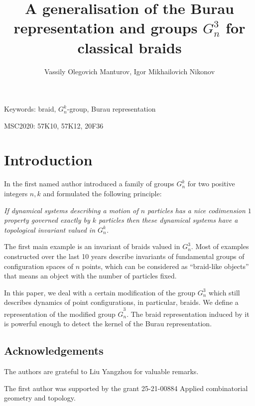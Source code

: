 \documentclass{article}
\title{A generalisation of the Burau representation and groups $G_{n}^{3}$ for classical braids}
\author{Vassily Olegovich Manturov, Igor Mikhailovich Nikonov}
\date{}
\theoremstyle{definition}
\begin{document}
\maketitle


{Keywords: braid, $G^k_n$-group, Burau representation}

 {MSC2020: 57K10, 57K12, 20F36}





\section{Introduction}

In \cite{Ma} the first named author introduced a family of groups $G_{n}^{k}$ for two positive integers $n,k$ and formulated the following principle:

{\em If dynamical systems describing a motion of $n$ particles has a nice codimension $1$ property governed exactly by $k$
particles then these dynamical systems have a topological invariant valued in $G_{n}^{k}$.}

The first main example is an invariant of braids valued in $G_{n}^{3}$. 
Most of examples constructed over the last 10 years describe invariants of fundamental groups of configuration spaces
of $n$ points, which can be considered as ``braid-like objects'' that means an object with the number of particles fixed.

In this paper, we deal with a certain modification of the group $G^3_n$ which still describes dynamics of point configurations, in particular, braids. We define a representation of the modified group $\hat G^3_n$. The braid representation induced by it is powerful enough to detect the kernel of the Burau representation. 

\subsection{Acknowledgements}
The authors are grateful to Liu Yangzhou for valuable remarks. 

The first author was supported by the grant 25-21-00884 Applied combinatorial geometry and topology.
\end{document}
